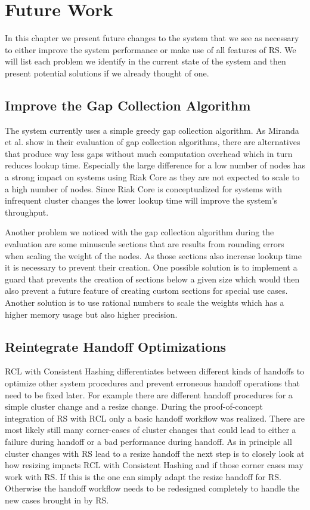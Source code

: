 \chapter{Future Work}
In this chapter we present future changes to the system that we see as necessary to either improve the system performance or make use of all features of \ac{RS}.
We will list each problem we identify in the current state of the system and then present potential solutions if we already thought of one.

\section{Improve the Gap Collection Algorithm}
The system currently uses a simple greedy gap collection algorithm.
As Miranda et al. show in their evaluation of gap collection algorithms\cite{Miranda2014}, there are alternatives that produce way less gaps without much computation overhead which in turn reduces lookup time.
Especially the large difference for a low number of nodes has a strong impact on systems using Riak Core as they are not expected to scale to a high number of nodes.
Since Riak Core is conceptualized for systems with infrequent cluster changes the lower lookup time will improve the system's throughput.

Another problem we noticed with the gap collection algorithm during the evaluation are some minuscule sections that are results from rounding errors when scaling the weight of the nodes.
As those sections also increase lookup time it is necessary to prevent their creation.
One possible solution is to implement a guard that prevents the creation of sections below a given size which would then also prevent a future feature of creating custom sections for special use cases.
Another solution is to use rational numbers to scale the weights which has a higher memory usage but also higher precision.


\section{Reintegrate Handoff Optimizations}
\ac{RCL} with Consistent Hashing differentiates between different kinds of handoffs to optimize other system procedures and prevent erroneous handoff operations that need to be fixed later.
For example there are different handoff procedures for a simple cluster change and a resize change.
During the proof-of-concept integration of \ac{RS} with \ac{RCL} only a basic handoff workflow was realized.
There are most likely still many corner-cases of cluster changes that could lead to either a failure during handoff or a bad performance during handoff.
As in principle all cluster changes with \ac{RS} lead to a resize handoff the next step is to closely look at how resizing impacts \ac{RCL} with Consistent Hashing and if those corner cases may work with \ac{RS}.
If this is the one can simply adapt the resize handoff for \ac{RS}.
Otherwise the handoff workflow needs to be redesigned completely to handle the new cases brought in by \ac{RS}.


